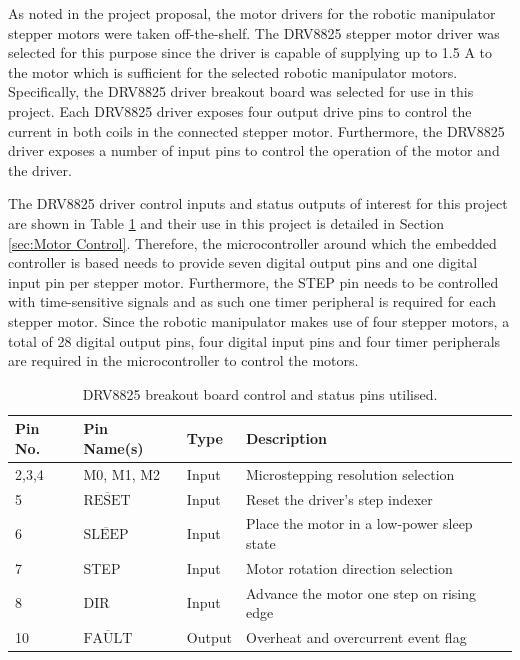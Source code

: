 As noted in the project proposal, the motor drivers for the robotic manipulator stepper motors were taken off-the-shelf. The DRV8825 stepper motor driver was selected for this purpose since the driver is capable of supplying up to 1.5 A to the motor which is sufficient for the selected robotic manipulator motors. Specifically, the DRV8825 driver breakout board was selected for use in this project. Each DRV8825 driver exposes four output drive pins to control the current in both coils in the connected stepper motor. Furthermore, the DRV8825 driver exposes a number of input pins to control the operation of the motor and the driver.

The DRV8825 driver control inputs and status outputs of interest for this project are shown in Table \ref{tab:drv8825-input-pins} and their use in this project is detailed in Section \ref{sec:Motor Control}. Therefore, the microcontroller around which the embedded controller is based needs to provide seven digital output pins and one digital input pin per stepper motor. Furthermore, the STEP pin needs to be controlled with time-sensitive signals and as such one timer peripheral is required for each stepper motor. Since the robotic manipulator makes use of four stepper motors, a total of 28 digital output pins, four digital input pins and four timer peripherals are required in the microcontroller to control the motors.

\begin{table}[H]
	\renewcommand{\arraystretch}{1.3}
	\centering
	\begin{tabular}{|>{\raggedright}m{1.5cm}|>{\raggedright}m{2.3cm}|>{\raggedright}m{1.5cm}|>{\raggedright\arraybackslash}m{8cm}|}
		\hline
		\textbf{Pin No.} & \textbf{Pin Name(s)} & \textbf{Type} & \textbf{Description} \\
		\hline
		2,3,4 & M0, M1, M2 & Input & Microstepping resolution selection \\
		\hline
		5 & $\overline{\text{RESET}}$ & Input & Reset the driver's step indexer \\
		\hline
		6 & $\overline{\text{SLEEP}}$ & Input & Place the motor in a low-power sleep state \\
		\hline
		7 & STEP & Input & Motor rotation direction selection \\
		\hline
		8 & DIR & Input & Advance the motor one step on rising edge \\
		\hline
		10 & $\overline{\text{FAULT}}$ & Output & Overheat and overcurrent event flag \\
		\hline
	\end{tabular}
	\caption[Caption for LOF]{\label{tab:drv8825-input-pins}DRV8825 breakout board control and status pins utilised.\footnotemark}
\end{table}

